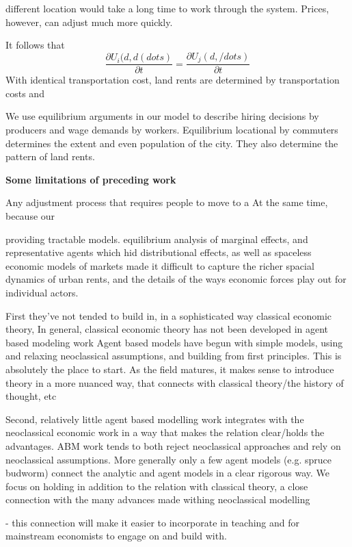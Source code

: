 different location would take a long time to work through the system. Prices, however, can adjust much more quickly. 

 It follows that 
\[\frac{\partial U_i(d, d(dots)}{\partial t}=\frac{\partial U_j(d, /dots)}{\partial t}\]
With identical transportation cost, 
land rents are determined by transportation costs  and  

We use  equilibrium arguments in our model to describe hiring decisions by producers and wage demands by workers. Equilibrium locational by commuters determines the extent and even population of the city. They also determine the pattern of land rents. 


\textbf{Some limitations of preceding work}%


Any adjustment process that requires people to move to a 
At the same time, because our  

providing tractable models.  equilibrium analysis of marginal effects, and representative agents which hid distributional effects, as well as spaceless economic models of markets made it difficult to capture the richer spacial dynamics of urban rents, and the details of the ways economic forces play out for individual actors.

First they've not tended to build in, in a sophisticated way classical economic theory,
In general, classical economic theory has not been developed in agent based modeling work
Agent based models have begun with simple models, using and relaxing neoclassical assumptions, and building from first principles. This is absolutely the place to start. As the field matures, it makes sense to introduce theory in a more nuanced way, that connects with classical theory/the history of thought, etc

Second, relatively little agent based modelling work integrates with the neoclassical economic work in a way that makes the relation clear/holds the advantages. ABM work tends to both reject neoclassical approaches and rely on neoclassical assumptions.
More generally only a few agent models (e.g. spruce budworm) connect the analytic and agent models in a clear rigorous way. We focus on holding in addition to the relation with classical theory, a close connection with the many advances made withing neoclassical modelling

- this connection will make it easier to incorporate in teaching and for mainstream economists to engage on and build with.

